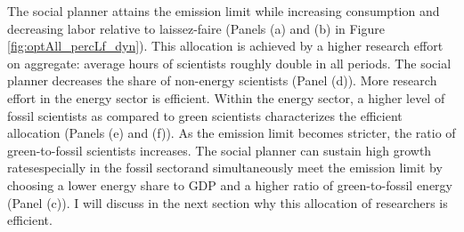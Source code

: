 %
The social planner attains the emission limit while increasing consumption and decreasing labor  relative to laissez-faire (Panels (a) and (b) in Figure \ref{fig:optAll_percLf_dyn}). This allocation is achieved by a higher research effort on aggregate: average hours of scientists roughly double in all periods. The social planner decreases the share of non-energy scientists (Panel (d)). More research effort in the energy sector is efficient. Within the energy sector, a higher level of fossil scientists as compared to green scientists characterizes the efficient allocation (Panels (e) and (f)). As the emission limit becomes stricter, the ratio of green-to-fossil scientists increases.
The social planner can sustain high growth rates\textemdash especially in the fossil sector\textemdash and simultaneously meet the emission limit by choosing a lower energy share to GDP and a higher ratio of green-to-fossil energy (Panel (c)).  I will discuss in the next section why this allocation of researchers is efficient.


